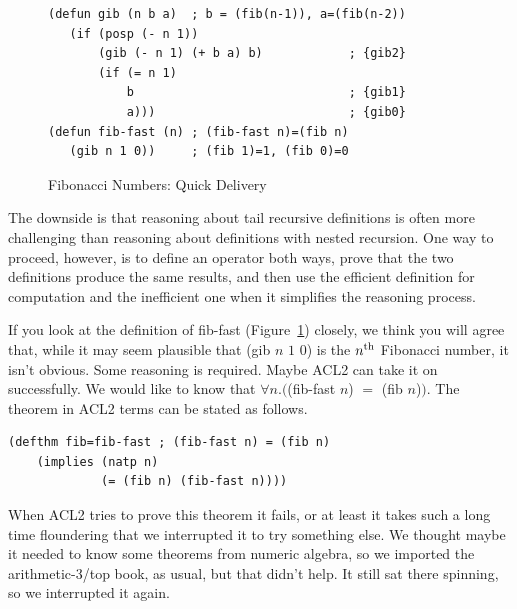 \begin{figure}
\begin{center}
\begin{Verbatim}
(defun gib (n b a)  ; b = (fib(n-1)), a=(fib(n-2))
   (if (posp (- n 1))
       (gib (- n 1) (+ b a) b)            ; {gib2}
       (if (= n 1)
           b                              ; {gib1}
           a)))                           ; {gib0}
(defun fib-fast (n) ; (fib-fast n)=(fib n)
   (gib n 1 0))     ; (fib 1)=1, (fib 0)=0
\end{Verbatim}
\end{center}
\caption{Fibonacci Numbers: Quick Delivery}
\label{fig:gib-defun}
\end{figure}

The downside is that reasoning
about tail recursive
definitions is often more challenging than reasoning about definitions
with nested recursion. One way to proceed, however,
is to define an operator both ways, prove that the two definitions
produce the same results, and then use the efficient definition
for computation and the inefficient one when it
simplifies the reasoning process.

If you look at the definition of \textsf{fib-fast} (Figure~\ref{fig:gib-defun})
closely, we think you will agree that, while it may seem plausible
that \textsf{(gib $n$ $1$ $0$)} is the $n^\textnormal{th}$ Fibonacci number,
it isn't obvious.
Some reasoning is required.
Maybe ACL2 can take it on successfully.
We would like to know that $\forall n.($\textsf{(fib-fast $n$)} $=$ \textsf{(fib $n$)}$)$.
The theorem in ACL2 terms can be stated as follows.
\begin{samepage}
\begin{center}
\begin{Verbatim}
(defthm fib=fib-fast ; (fib-fast n) = (fib n)
    (implies (natp n)
             (= (fib n) (fib-fast n))))
\end{Verbatim}
\end{center}
\end{samepage}

When ACL2 tries to prove this theorem it fails,
or at least it takes such a long time floundering that we interrupted it
to try something else.
We thought maybe it needed to know some theorems from numeric
algebra, so we imported the arithmetic-3/top book, as usual,
but that didn't help. It still sat there spinning,
so we interrupted it again.

